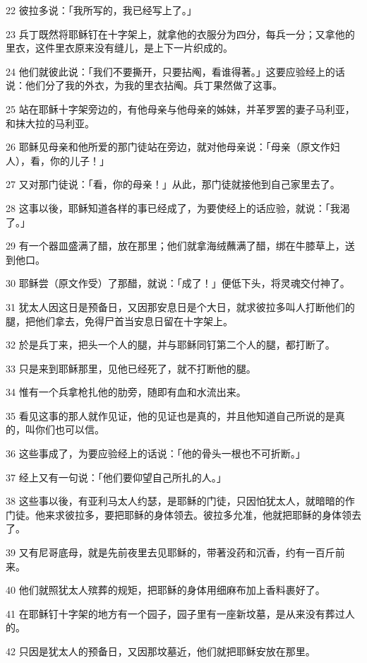 \par 22 彼拉多说：「我所写的，我已经写上了。」
\par 23 兵丁既然将耶稣钉在十字架上，就拿他的衣服分为四分，每兵一分；又拿他的里衣，这件里衣原来没有缝儿，是上下一片织成的。
\par 24 他们就彼此说：「我们不要撕开，只要拈阄，看谁得著。」这要应验经上的话说：他们分了我的外衣，为我的里衣拈阄。兵丁果然做了这事。
\par 25 站在耶稣十字架旁边的，有他母亲与他母亲的姊妹，并革罗罢的妻子马利亚，和抹大拉的马利亚。
\par 26 耶稣见母亲和他所爱的那门徒站在旁边，就对他母亲说：「母亲（原文作妇人），看，你的儿子！」
\par 27 又对那门徒说：「看，你的母亲！」从此，那门徒就接他到自己家里去了。
\par 28 这事以後，耶稣知道各样的事已经成了，为要使经上的话应验，就说：「我渴了。」
\par 29 有一个器皿盛满了醋，放在那里；他们就拿海绒蘸满了醋，绑在牛膝草上，送到他口。
\par 30 耶稣尝（原文作受）了那醋，就说：「成了！」便低下头，将灵魂交付神了。
\par 31 犹太人因这日是预备日，又因那安息日是个大日，就求彼拉多叫人打断他们的腿，把他们拿去，免得尸首当安息日留在十字架上。
\par 32 於是兵丁来，把头一个人的腿，并与耶稣同钉第二个人的腿，都打断了。
\par 33 只是来到耶稣那里，见他已经死了，就不打断他的腿。
\par 34 惟有一个兵拿枪扎他的肋旁，随即有血和水流出来。
\par 35 看见这事的那人就作见证，他的见证也是真的，并且他知道自己所说的是真的，叫你们也可以信。
\par 36 这些事成了，为要应验经上的话说：「他的骨头一根也不可折断。」
\par 37 经上又有一句说：「他们要仰望自己所扎的人。」
\par 38 这些事以後，有亚利马太人约瑟，是耶稣的门徒，只因怕犹太人，就暗暗的作门徒。他来求彼拉多，要把耶稣的身体领去。彼拉多允准，他就把耶稣的身体领去了。
\par 39 又有尼哥底母，就是先前夜里去见耶稣的，带著没药和沉香，约有一百斤前来。
\par 40 他们就照犹太人殡葬的规矩，把耶稣的身体用细麻布加上香料裹好了。
\par 41 在耶稣钉十字架的地方有一个园子，园子里有一座新坟墓，是从来没有葬过人的。
\par 42 只因是犹太人的预备日，又因那坟墓近，他们就把耶稣安放在那里。

